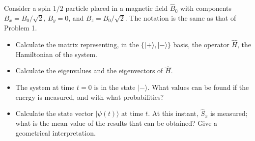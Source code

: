 \documentclass[12pt,a4paper]{article}
\newenvironment{problem}[2][Problem]{\begin{trivlist}
\item[\hskip \labelsep {\bfseries #1}\hskip \labelsep {\bfseries #2.}]}{\end{trivlist}}
\begin{document}
\begin{problem}{2}
[C-T Exercise 4-3] Consider a spin $1/2$ particle placed in a magnetic field $\hat{B}_0$ with components $B_x=B_0/\sqrt{2}$, $B_y=0$, and $B_z=B_0/\sqrt{2}$. The notation is the same as that of Problem 1.
\begin{itemize}
\item[(a)] Calculate the matrix representing, in the $\{|+\rangle,|-\rangle\}$ basis, the operator $\hat{H}$, the Hamiltonian of the system.
\item[(b)] Calculate the eigenvalues and the eigenvectors of $\hat{H}$.
\item[(c)] The system at time $t=0$ is in the state $|-\rangle$. What values can be found if the energy is measured, and with what probabilities?
\item[(d)] Calculate the state vector $|\psi(t)\rangle$ at time $t$. At this instant, $\hat{S}_x$ is measured; what is the mean value of the results that can be obtained? Give a geometrical interpretation.
\end{itemize}
\end{problem}
\end{document}
